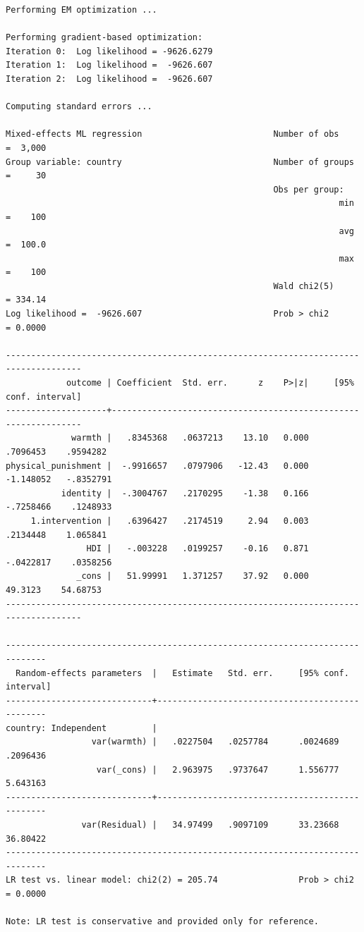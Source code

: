 \documentclass[
  letterpaper,
  DIV=11,
  numbers=noendperiod]{scrreprt}
\begin{document}
\begin{verbatim}
Performing EM optimization ...

Performing gradient-based optimization: 
Iteration 0:  Log likelihood = -9626.6279  
Iteration 1:  Log likelihood =  -9626.607  
Iteration 2:  Log likelihood =  -9626.607  

Computing standard errors ...

Mixed-effects ML regression                          Number of obs    =  3,000
Group variable: country                              Number of groups =     30
                                                     Obs per group:
                                                                  min =    100
                                                                  avg =  100.0
                                                                  max =    100
                                                     Wald chi2(5)     = 334.14
Log likelihood =  -9626.607                          Prob > chi2      = 0.0000

-------------------------------------------------------------------------------------
            outcome | Coefficient  Std. err.      z    P>|z|     [95% conf. interval]
--------------------+----------------------------------------------------------------
             warmth |   .8345368   .0637213    13.10   0.000     .7096453    .9594282
physical_punishment |  -.9916657   .0797906   -12.43   0.000    -1.148052   -.8352791
           identity |  -.3004767   .2170295    -1.38   0.166    -.7258466    .1248933
     1.intervention |   .6396427   .2174519     2.94   0.003     .2134448    1.065841
                HDI |   -.003228   .0199257    -0.16   0.871    -.0422817    .0358256
              _cons |   51.99991   1.371257    37.92   0.000      49.3123    54.68753
-------------------------------------------------------------------------------------

------------------------------------------------------------------------------
  Random-effects parameters  |   Estimate   Std. err.     [95% conf. interval]
-----------------------------+------------------------------------------------
country: Independent         |
                 var(warmth) |   .0227504   .0257784      .0024689    .2096436
                  var(_cons) |   2.963975   .9737647      1.556777    5.643163
-----------------------------+------------------------------------------------
               var(Residual) |   34.97499   .9097109      33.23668    36.80422
------------------------------------------------------------------------------
LR test vs. linear model: chi2(2) = 205.74                Prob > chi2 = 0.0000

Note: LR test is conservative and provided only for reference.
\end{verbatim}
\end{document}
